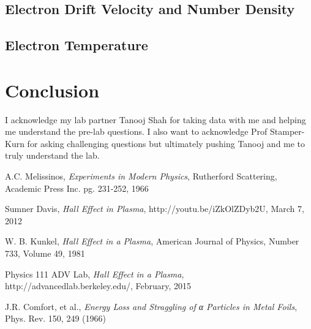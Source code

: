 \subsection{Electron Drift Velocity and Number Density}



\subsection{Electron Temperature}



\section{Conclusion}





\begin{acknowledgments} I acknowledge my lab partner Tanooj Shah for taking data with me and helping me understand the pre-lab questions. I also want to acknowledge Prof Stamper-Kurn for asking challenging questions but ultimately pushing Tanooj and me to truly understand the lab.
\end{acknowledgments}

\begin{thebibliography}{9}

  A.C. Melissinos, \emph{Experiments in Modern Physics}, Rutherford Scattering, Academic Press Inc. pg. 231-252, 1966

  Sumner Davis, \emph{Hall Effect in Plasma}, http://youtu.be/iZkOlZDyb2U, March 7, 2012

  W. B. Kunkel, \emph{Hall Effect in a Plasma}, American Journal of Physics, Number 733, Volume 49, 1981

  Physics 111 ADV Lab, \emph{Hall Effect in a Plasma}, http://advancedlab.berkeley.edu/, February, 2015

J.R. Comfort, et al., \emph{Energy Loss and Straggling of α Particles in Metal Foils}, Phys. Rev. 150, 249 (1966)

\end{thebibliography}



